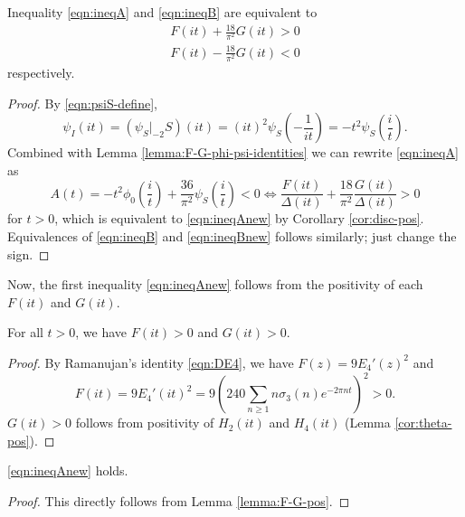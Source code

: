 \begin{lemma}\label{lemma:ineqABnew-equiv}
Inequality \eqref{eqn:ineqA} and \eqref{eqn:ineqB} are equivalent to
\begin{align}
    F(it) + \frac{18}{\pi^2} G(it) > 0 \label{eqn:ineqAnew} \\
    F(it) - \frac{18}{\pi^2} G(it) < 0 \label{eqn:ineqBnew}
\end{align}
respectively.
\end{lemma}
\begin{proof}
By \eqref{eqn:psiS-define},
\begin{equation}
    \psi_I(it) = (\psi_S|_{-2}S)(it) = (it)^{2}\psi_S\left(-\frac{1}{it}\right) = -t^2 \psi_S\left(\frac{i}{t}\right).
\end{equation}
Combined with Lemma \ref{lemma:F-G-phi-psi-identities} we can rewrite \eqref{eqn:ineqA} as
\begin{equation}
    A(t) = -t^2 \phi_0\left(\frac{i}{t}\right) + \frac{36}{\pi^2} \psi_S\left(\frac{i}{t}\right) < 0 \Leftrightarrow \frac{F(it)}{\Delta(it)} + \frac{18}{\pi^2} \frac{G(it)}{\Delta(it)} > 0
\end{equation}
for $t > 0$, which is equivalent to \eqref{eqn:ineqAnew} by Corollary \ref{cor:disc-pos}.
Equivalences of \eqref{eqn:ineqB} and \eqref{eqn:ineqBnew} follows similarly; just change the sign.
\end{proof}


Now, the first inequality \eqref{eqn:ineqAnew} follows from the positivity of each $F(it)$ and $G(it)$.

\begin{lemma}\label{lemma:F-G-pos}\leanok
For all $t > 0$, we have $F(it) > 0$ and $G(it) > 0$.
\end{lemma}
\begin{proof}\leanok
By Ramanujan's identity \eqref{eqn:DE4}, we have $F(z) = 9 E_4'(z)^2$ and
\begin{equation}
    F(it) = 9E_4'(it)^2 = 9 \left(240\sum_{n \geq 1} n \sigma_3(n) e^{-2 \pi n t} \right)^{2} > 0.
\end{equation}
$G(it) > 0$ follows from positivity of $H_2(it)$ and $H_4(it)$ (Lemma \ref{cor:theta-pos}).
\end{proof}

\begin{corollary}\label{cor:ineqAnew}\leanok
\eqref{eqn:ineqAnew} holds.
\end{corollary}
\begin{proof}
This directly follows from Lemma \ref{lemma:F-G-pos}.
\end{proof}

